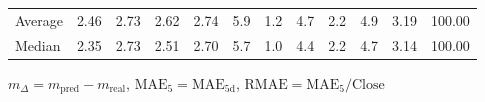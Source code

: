 \begin{threeparttable}
{\begin{tabular}{lrrrrrrrrrrr}
Average &          2.46 &          2.73 &          2.62 &        2.74 &                 5.9 &                 1.2 &        4.7 &                 2.2 &              4.9 &            3.19 &                 100.00 \\
 Median &          2.35 &          2.73 &          2.51 &        2.70 &                 5.7 &                 1.0 &        4.4 &                 2.2 &              4.7 &            3.14 &                 100.00 \\
\bottomrule
\end{tabular}
}
\begin{tablenotes}\footnotesize
\item $m_\Delta=m_{\text{pred}}-m_{\text{real}}$,
$\mathrm{MAE}_5=\mathrm{MAE}_{5\text{d}}$,
$\mathrm{RMAE}=\mathrm{MAE}_5/\text{Close}$
\end{tablenotes}
\end{threeparttable}
\endgroup

